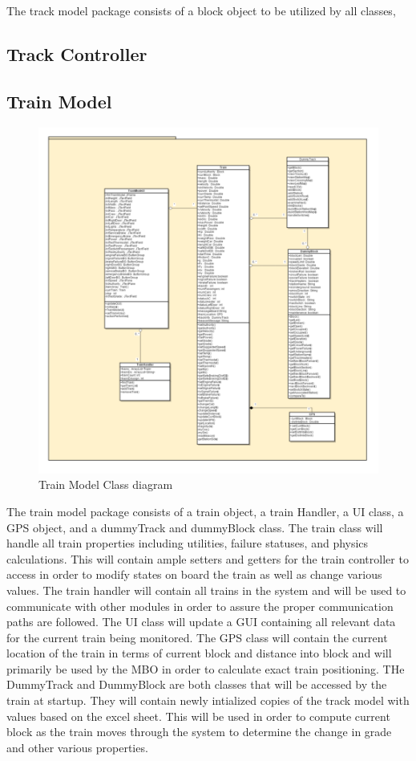 \documentclass[]{article}
\begin{document}
The track model package consists of a block object to be utilized by all classes, 
\subsection{Track Controller}
\subsection{Train Model}
\begin{figure}[H]
	\centering
	\includegraphics[width=\textwidth]{trainmodelclassdiagram.png}
	\caption{Train Model Class diagram}
\end{figure}

The train model package consists of a train object, a train Handler, a UI class, a GPS object, and a dummyTrack and dummyBlock class. The train class will handle all train properties including utilities, failure statuses, and physics calculations. This will contain ample setters and getters for the train controller to access in order to modify states on board the train as well as change various values. The train handler will contain all trains in the system and will be used to communicate with other modules in order to assure the proper communication paths are followed. The UI class will update a GUI containing all relevant data for the current train being monitored. The GPS class will contain the current location of the train in terms of current block and distance into block and will primarily be used by the MBO in order to calculate exact train positioning. THe DummyTrack and DummyBlock are both classes that will be accessed by the train at startup. They will contain newly intialized copies of the track model with values based on the excel sheet. This will be used in order to compute current block as the train moves through the system to determine the change in grade and other various properties.
\end{document}
